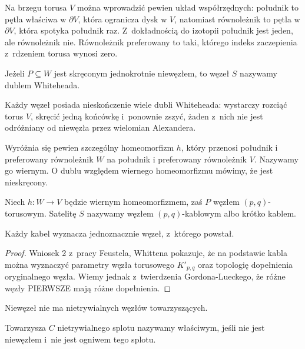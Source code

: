 Na brzegu torusa $V$ można wprowadzić pewien układ współrzędnych: południk to pętla właściwa w $\partial V$, która ogranicza dysk w $V$, natomiast równoleżnik to pętla w $\partial V$, która spotyka południk raz.
Z~dokładnością do izotopii południk jest jeden, ale równoleżnik nie.
Równoleżnik preferowany to taki, którego indeks zaczepienia z~rdzeniem torusa wynosi zero.

\begin{definition}
%
    Jeżeli $P \subseteq W$ jest skręconym jednokrotnie niewęzłem, to węzeł $S$ nazywamy dublem Whiteheada.
\end{definition}

Każdy węzeł posiada nieskończenie wiele dubli Whiteheada: wystarczy rozciąć torus $V$, skręcić jedną końcówkę i~ponownie zszyć, żaden z~nich nie jest odróżniany od niewęzła przez wielomian Alexandera.

Wyróżnia się pewien szczególny homeomorfizm $h$, który przenosi południk i preferowany równoleżnik $W$ na południk i preferowany równoleżnik $V$.
Nazywamy go wiernym.
O dublu względem wiernego homeomorfizmu mówimy, że jest nieskręcony.

\begin{definition}
%
    Niech $h \colon W \to V$ będzie wiernym homeomorfizmem, zaś $P$ węzłem $(p, q)$-torusowym.
    Satelitę $S$ nazywamy węzłem $(p, q)$-kablowym albo krótko kablem.
\end{definition}

\begin{proposition}
    Każdy kabel wyznacza jednoznacznie węzeł, z~którego powstał.
\end{proposition}

\begin{proof}
%
%
    Wniosek 2 z~pracy \cite{feustel1978} Feustela, Whittena pokazuje, że na podstawie kabla można wyznaczyć parametry węzła torusowego $K'_{p,q}$ oraz topologię dopełnienia oryginalnego węzła.
    Wiemy jednak z~twierdzenia Gordona-Lueckego, że różne węzły PIERWSZE mają różne dopełnienia.
\end{proof}

Niewęzeł nie ma nietrywialnych węzłów towarzyszących.

\begin{definition}
    Towarzysza $C$ nietrywialnego splotu nazywamy właściwym, jeśli nie jest niewęzłem i~nie jest ogniwem tego splotu.
\end{definition}

